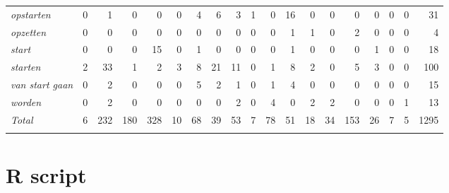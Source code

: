 \begin{table}
{\begin{tabular}{>{\itshape}lrrrrrrrrrrrrrrrrrr}
opstarten &  0 &  1 &  0 &  0 &  0 &  4 &  6 &  3 &  1 &  0 &  16 &  0 &  0 &  0 &  0 &  0 &  0 &  31\\
opzetten &  0 &  0 &  0 &  0 &  0 &  0 &  0 &  0 &  0 &  0 &  1 &  1 &  0 &  2 &  0 &  0 &  0 &  4\\
start &  0 &  0 &  0 &  15 &  0 &  1 &  0 &  0 &  0 &  0 &  1 &  0 &  0 &  0 &  1 &  0 &  0 &  18\\
starten &  2 &  33 &  1 &  2 &  3 &  8 &  21 &  11 &  0 &  1 &  8 &  2 &  0 &  5 &  3 &  0 &  0 &  100\\
van start gaan &  0 &  2 &  0 &  0 &  0 &  5 &  2 &  1 &  0 &  1 &  4 &  0 &  0 &  0 &  0 &  0 &  0 &  15\\
worden &  0 &  2 &  0 &  0 &  0 &  0 &  0 &  2 &  0 &  4 &  0 &  2 &  2 &  0 &  0 &  0 &  1 &  13\\
\midrule
\normalfont Total & 6 &  232 &  180 &  328 &  10 &  68 &  39 &  53 &  7 &  78 &  51 &  18 &  34 &  153 &  26 &  7 &  5 &  1295\\
\lspbottomrule
\end{tabular}}
\end{table} 

\chapter{R script}\label{ch:B}


